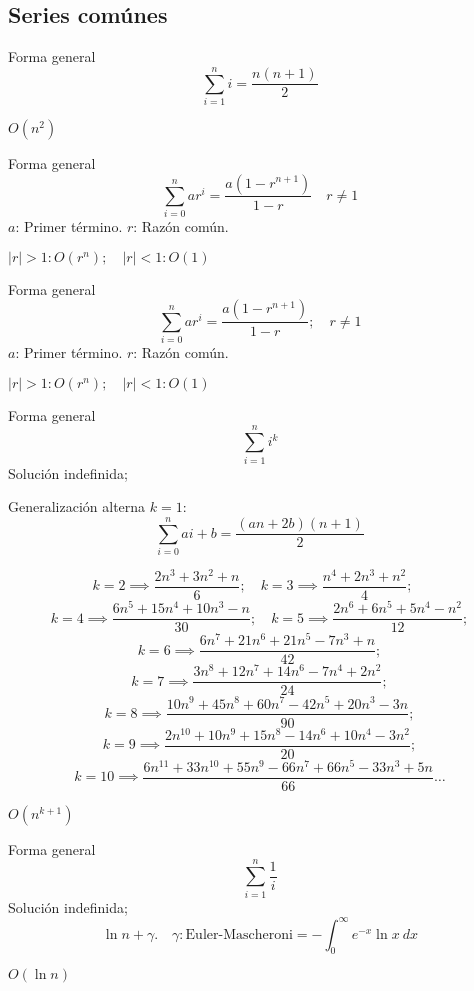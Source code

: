 \documentclass[tikz,11pt,fleqn]{book} %
\begin{document}
\subsection{Series comúnes}

\begin{definition}[Aritmética]
	Forma general
	$$ \sum_{i=1}^ni = \frac{n(n+1)}2 $$
	\begin{fact}[Orden]
		$O(n^2)$
	\end{fact}
\end{definition}

\begin{definition}[Geométrica]
	Forma general
	$$ \sum_{i=0}^nar^i = \frac{a(1-r^{n+1})}{1-r}\quad r\ne1 $$
	$a$: Primer término. $r$: Razón común.
	\begin{fact}[Orden]
		$|r|>1:O(r^n);\quad|r|<1:O(1)$
	\end{fact}
\end{definition}

\begin{definition}[Base 2]
	Forma general
	$$ \sum_{i=0}^nar^i = \frac{a(1-r^{n+1})}{1-r};\quad r\ne1 $$
	$a$: Primer término. $r$: Razón común.
	\begin{fact}[Orden]
		$|r|>1:O(r^n);\quad|r|<1:O(1)$
	\end{fact}
\end{definition}

\begin{definition}[Potencias]
	Forma general
	$$ \sum_{i=1}^ni^k$$
	Solución indefinida;
	\begin{remark}Generalización alterna $k=1$:
		$$\sum_{i=0}^nai+b=\frac{(an+2b)(n+1)}2$$
	\end{remark}
	$$
		k=2\implies\frac{2n^3+3n^2+n}6;\quad
		k=3\implies\frac{n^4+2n^3+n^2}4;\quad
	$$ $$
		k=4\implies\frac{6n^5+15n^4+10n^3-n}{30};\quad
		k=5\implies\frac{2n^6+6n^5+5n^4-n^2}{12};
	$$ $$
		k=6\implies\frac{6n^7+21n^6+21n^5-7n^3+n}{42};
	$$ $$
		k=7\implies\frac{3n^8+12n^7+14n^6-7n^4+2n^2}{24};
	$$ $$
		k=8\implies\frac{10n^9+45n^8+60n^7-42n^5+20n^3-3n}{90};
	$$ $$
		k=9\implies\frac{2n^{10}+10n^9+15n^8-14n^6+10n^4-3n^2}{20};
	$$ $$
		k=10\implies\frac{6n^{11}+33n^{10}+55n^9-66n^7+66n^5-33n^3+5n}{66}\dots
	$$

	\begin{fact}[Orden]
		$O(n^{k+1})$
	\end{fact}
\end{definition}

\begin{definition}[Armónica]
	Forma general
	$$ \sum_{i=1}^n\frac1i$$
	Solución indefinida;
	$$ \ln n+\gamma.\quad\gamma:\text{Euler-Mascheroni}=-\int_0^\infty e^{-x}\ln x~dx $$
	\begin{fact}[Orden]
		$O(\ln n)$
	\end{fact}
\end{definition}
\end{document}
